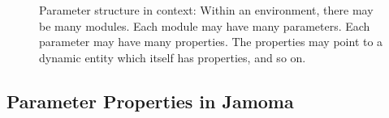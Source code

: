 \documentclass{article}
\begin{document}
\begin{figure}
\centerline{}
\caption{Parameter structure in context: Within an environment, there may be many modules. Each module may have many parameters. Each parameter may have many properties. The properties may point to a dynamic entity which itself has properties, and so on.}
\label{fig:structure}
\end{figure}


\subsection{Parameter Properties in Jamoma} %

\end{document}
